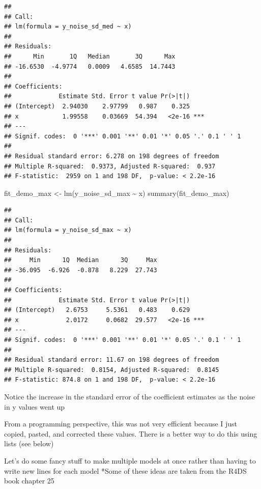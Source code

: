 \documentclass[
]{book}
\newenvironment{Shaded}{\begin{snugshade}}{\end{snugshade}}
\newcommand{\FunctionTok}[1]{\textcolor[rgb]{0.00,0.00,0.00}{#1}}
\newcommand{\NormalTok}[1]{#1}
\newcommand{\OtherTok}[1]{\textcolor[rgb]{0.56,0.35,0.01}{#1}}
\newcommand{\SpecialCharTok}[1]{\textcolor[rgb]{0.00,0.00,0.00}{#1}}
\begin{document}
\begin{verbatim}
## 
## Call:
## lm(formula = y_noise_sd_med ~ x)
## 
## Residuals:
##      Min       1Q   Median       3Q      Max 
## -16.6530  -4.9774   0.0009   4.6585  14.7443 
## 
## Coefficients:
##             Estimate Std. Error t value Pr(>|t|)    
## (Intercept)  2.94030    2.97799   0.987    0.325    
## x            1.99558    0.03669  54.394   <2e-16 ***
## ---
## Signif. codes:  0 '***' 0.001 '**' 0.01 '*' 0.05 '.' 0.1 ' ' 1
## 
## Residual standard error: 6.278 on 198 degrees of freedom
## Multiple R-squared:  0.9373, Adjusted R-squared:  0.937 
## F-statistic:  2959 on 1 and 198 DF,  p-value: < 2.2e-16
\end{verbatim}

\begin{Shaded}
\begin{Highlighting}[]
\NormalTok{fit\_demo\_max }\OtherTok{\textless{}{-}} \FunctionTok{lm}\NormalTok{(y\_noise\_sd\_max }\SpecialCharTok{\textasciitilde{}}\NormalTok{ x)}
\FunctionTok{summary}\NormalTok{(fit\_demo\_max)}
\end{Highlighting}
\end{Shaded}

\begin{verbatim}
## 
## Call:
## lm(formula = y_noise_sd_max ~ x)
## 
## Residuals:
##     Min      1Q  Median      3Q     Max 
## -36.095  -6.926  -0.878   8.229  27.743 
## 
## Coefficients:
##             Estimate Std. Error t value Pr(>|t|)    
## (Intercept)   2.6753     5.5361   0.483    0.629    
## x             2.0172     0.0682  29.577   <2e-16 ***
## ---
## Signif. codes:  0 '***' 0.001 '**' 0.01 '*' 0.05 '.' 0.1 ' ' 1
## 
## Residual standard error: 11.67 on 198 degrees of freedom
## Multiple R-squared:  0.8154, Adjusted R-squared:  0.8145 
## F-statistic: 874.8 on 1 and 198 DF,  p-value: < 2.2e-16
\end{verbatim}

Notice the increase in the standard error of the coefficient estimates as the noise in y values went up

From a programming perspective, this was not very efficient because I just copied, pasted, and corrected these values.
There is a better way to do this using lists (see below)

Let's do some fancy stuff to make multiple models at once rather than having to write new lines for each model
*Some of these ideas are taken from the R4DS book chapter 25
\end{document}
